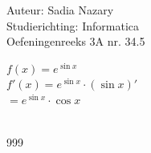 \documentclass[a4paper]{article}
\begin{document}
  
\noindent \large Auteur: Sadia Nazary  \\
\noindent \large Studierichting: Informatica\\
\noindent \large Oefeningenreeks 3A nr. 34.5\\

\medskip

\normalsize

$f(x)=e^{\sin x}$ \\

$f'(x)=e^{\sin x} \cdot (\sin x)'$ \\

$=e^{\sin x} \cdot \cos x$ \\

 \\

\begin{thebibliography}{999}
\end{thebibliography}
\end{document}

